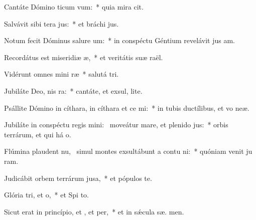 \item Cantáte Dómino ticum vum:~* quia mira cit.
\item Salvávit sibi tera jus:~* et bráchi  jus.
\item Notum fecit Dóminus salure um:~* in conspéctu Géntium revelávit jus am.
\item Recordátus est miseridiæ æ,~* et veritátis suæ  raël.
\item Vidérunt omnes mini ræ~* salutá  tri.
\item Jubiláte Deo, nis ra:~* cantáte, et exsul,  lite.
\item Psállite Dómino in cíthara, in cíthara et ce mi:~* in tubis ductílibus, et vo  neæ.
\item Jubiláte in conspéctu regis mini:~\pscross{} moveátur mare, et plenido jus:~* orbis terrárum, et qui há  o.
\item Flúmina plaudent nu,~\pscross{} simul montes exsultábunt a contu ni:~* quóniam venit ju ram.
\item Judicábit orbem terrárum  jusa,~* et pópulos  te.
\item Glória tri, et o,~* et Spi to.
\item Sicut erat in princípio, et , et per,~* et in sǽcula sæ. men.
